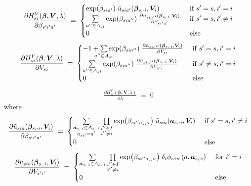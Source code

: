 \documentclass[11pt,fleqn]{article}
\newcommand{\bbeta}{\bm{\beta}}
\newcommand{\bV}{\bm{V}}
\newcommand{\ba}{\bm{a}}
\newcommand{\tu}{\tilde{u}}
\newcommand{\shortminus}{{\text{\scalebox{0.4}[1.0]{\(-\)}}}}
\newcommand{\minusi}{\shortminus i}
\newcommand{\shortrightarrow}{\parbox{4pt}{\tikz{\draw[->](0,0)--(4pt,0);}}}
\newcommand{\phiss}{\phi_{s\shortrightarrow s'}}
\begin{document}
\begin{align*}
	\frac{ \partial H_{si}^{V}(\bbeta,\bV,\lambda) }{ \partial \beta_{s'i'a'} } \;=\; 
		\begin{cases}
			\exp(\beta_{sia'}) \; \tu_{sia'}(\bbeta_{s,\minusi},\bV_i) & \text{ if } s'=s, i'=i \\
			\sum\limits_{a''\in A_{si}} \exp(\beta_{sia''}) \; \frac{ \partial \tu_{sia''}(\bbeta_{s,\minusi},\bV_i) }{ \partial \beta_{si'a'} } & \text{ if } s'=s, i' \neq i \\
			0 & \text{ else}
		\end{cases}
\end{align*}
\begin{align*}
	\frac{ \partial H_{si}^{V}(\bbeta,\bV,\lambda) }{ \partial V_{si} } \;=\; 
		\begin{cases}
			- 1 + \sum\limits_{\mathclap{a''\in A_{si}}} \exp(\beta_{sia''}) \; \frac{ \partial \tu_{sia''}(\bbeta_{s,\minusi},\bV_i) }{ \partial V_{si} } & \text{ if } s'=s, i'=i \\
			\sum\limits_{a''\in A_{si}} \exp(\beta_{sia''}) \; \frac{ \partial \tu_{sia''}(\bbeta_{s,\minusi},\bV_i) }{ \partial V_{s'i} } & \text{ if } s' \neq s, i'=i \\
			0 & \text{ else}
		\end{cases}
\end{align*}
\begin{align*}
	\frac{ \partial H_{si}^{V}(\bbeta,\bV,\lambda) }{ \partial \lambda } \;=\; 0
\end{align*}
where
\begin{align*}
	\frac{ \partial \tu_{sia}(\bbeta_{s,\minusi},\bV_i) }{ \partial \beta_{s'i'a'} } \;=\; 
		\begin{cases}
			\sum\limits_{\substack{\ba_{s,\minusi} \in A_{s,\minusi} \\ a_{si'}=a'}} \prod\limits_{\substack{i''\in I \\ i''\neq i}} \exp\bigl(\beta_{si''a_{si''}}\bigr) \; \tu_{sia}(\ba_{s,\minusi},\bV_i) & \text{ if } s'=s, i' \neq i \\
			0 & \text{ else}
		\end{cases}
\end{align*}
\begin{align*}
	\frac{ \partial \tu_{sia}(\bbeta_{s,\minusi},\bV_i) }{ \partial V_{s'i'} } \;=\; 
		\begin{cases}
			\sum\limits_{\ba_{s,\minusi} \in A_{s,\minusi}} \prod\limits_{\substack{i''\in I \\ i''\neq i}} \exp\bigl(\beta_{si''a_{si''}}\bigr) \; \delta_i \phiss(a, \ba_{s,\minusi}) & \text{ for } i'=i \\
			0 & \text{ else}
		\end{cases}
\end{align*}
\end{document}

